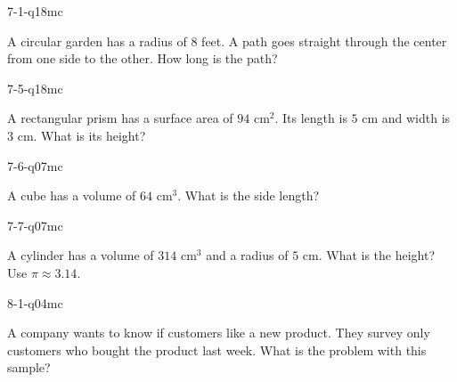 \begin{practiceQuestion}{7-1-q18}{mc}
\begin{questionText}
A circular garden has a radius of $8$ feet. A path goes straight through the center from one side to the other. How long is the path?
\end{questionText}
\end{practiceQuestion}

\begin{practiceQuestion}{7-5-q18}{mc}
\begin{questionText}
A rectangular prism has a surface area of $94$ cm$^2$. Its length is $5$ cm and width is $3$ cm. What is its height?
\end{questionText}
\end{practiceQuestion}

\begin{practiceQuestion}{7-6-q07}{mc}
\begin{questionText}
A cube has a volume of $64$ cm$^3$. What is the side length?
\end{questionText}
\end{practiceQuestion}

\begin{practiceQuestion}{7-7-q07}{mc}
\begin{questionText}
A cylinder has a volume of $314$ cm$^3$ and a radius of $5$ cm. What is the height? Use $\pi \approx 3.14$.
\end{questionText}
\end{practiceQuestion}

\begin{practiceQuestion}{8-1-q04}{mc}
\begin{questionText}
A company wants to know if customers like a new product. They survey only customers who bought the product last week. What is the problem with this sample?
\end{questionText}
\end{practiceQuestion}

